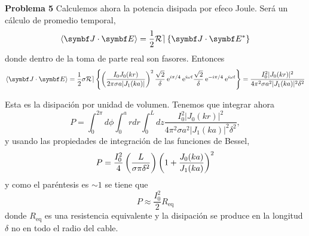 \documentclass[10pt,oneside]{CBFT_book}
\begin{document}
\begin{ejemplo}{\bf Problema 5}
Calculemos ahora la potencia disipada por efeco Joule. Será un cálculo de promedio temporal,
\[
	\langle \pe{J}{E}\rangle = \frac{1}{2} \mathcal{Re}\left\{ \vb J \cdot \vb E^* \right\}
\]
donde dentro de la toma de parte real son fasores. Entonces
\[
	\langle \pe{J}{E}\rangle = \frac{1}{2}\sigma 
	\mathcal{Re}\left\{ 
	\Frac{I_0 J_0(kr)}{2 \pi \sigma a |J_1(ka)|}^2 
	\frac{\sqrt{2}}{\delta} \euler^{i\pi/4} \euler^{i\omega t}
	\frac{\sqrt{2}}{\delta} \euler^{-i\pi/4} \euler^{i\omega t} \right\} =
	\frac{ I_0^2 |J_0(kr)|^2 }{ 4 \pi^2 \sigma a^2 |J_1(ka)|^2 \delta^2 }
\]

Esta es la disipación por unidad de volumen. Tenemos que integrar ahora
\[
	P = \int_0^{2\pi} d\phi \int_0^a r dr \int_0^L dz 
	\frac{ I_0^2 |J_0(kr)|^2 }{ 4 \pi^2 \sigma a^2 |J_1(ka)|^2 \delta^2 },
\]
y usando las propiedades de integración de las funciones de Bessel,
\[
	P = \frac{I_0^2}{4} \left( \frac{ L }{ \sigma \pi \delta^2  } \right) \left( 1 + \frac{J_0(ka)}{J_1(ka)} \right)^2
\]
y como el paréntesis es $\sim 1$ se tiene que
\[
	P \approx \frac{I_0^2}{2} R_{\text{eq}}
\]
donde $ R_{\text{eq}} $ es una resistencia equivalente y la disipación se produce en la longitud
$\delta$ no en todo el radio del cable.
 
\end{ejemplo}


\end{document}
